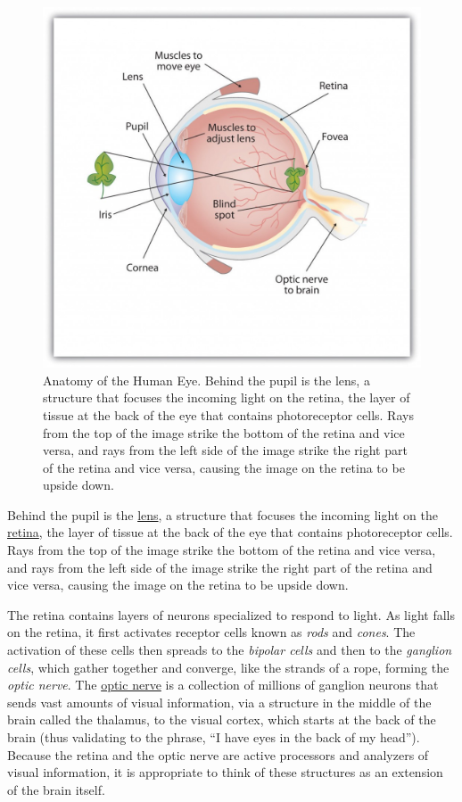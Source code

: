 \documentclass[
]{krantz}
\begin{document}
\begin{figure}

{\centering \includegraphics[width=0.6\linewidth]{images/ch2/fig1} 

}

\caption{Anatomy of the Human Eye. Behind the pupil is the lens, a structure that focuses the incoming light on the retina, the layer of tissue at the back of the eye that contains photoreceptor cells. Rays from the top of the image strike the bottom of the retina and vice versa, and rays from the left side of the image strike the right part of the retina and vice versa, causing the image on the retina to be upside down.}\label{fig:anatomy}
\end{figure}

Behind the pupil is the \protect\hyperlink{lens}{lens}, a structure that focuses the incoming light on the \protect\hyperlink{retina}{retina}, the layer of tissue at the back of the eye that contains photoreceptor cells. Rays from the top of the image strike the bottom of the retina and vice versa, and rays from the left side of the image strike the right part of the retina and vice versa, causing the image on the retina to be upside down.

The retina contains layers of neurons specialized to respond to light. As light falls on the retina, it first activates receptor cells known as \emph{rods} and \emph{cones}. The activation of these cells then spreads to the \emph{bipolar cells} and then to the \emph{ganglion cells}, which gather together and converge, like the strands of a rope, forming the \emph{optic nerve}. The \protect\hyperlink{optic-nerve}{optic nerve} is a collection of millions of ganglion neurons that sends vast amounts of visual information, via a structure in the middle of the brain called the thalamus, to the visual cortex, which starts at the back of the brain (thus validating to the phrase, ``I have eyes in the back of my head''). Because the retina and the optic nerve are active processors and analyzers of visual information, it is appropriate to think of these structures as an extension of the brain itself.
\end{document}
